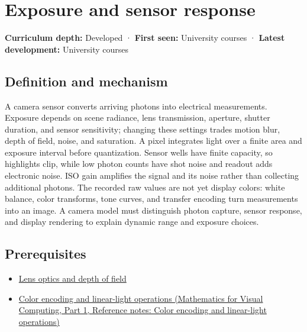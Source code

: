 \hypertarget{appendix-92d45cdf2afc}{}\label{referencestart:appendix-92d45cdf2afc}
\section{Exposure and sensor response}\label{appendix-92d45cdf2afc-exposure-and-sensor-response}

\hypertarget{appendix-92d45cdf2afc-exposure-and-sensor-response}{}

\textbf{Curriculum depth:} Developed · \textbf{First seen:} University courses · \textbf{Latest development:} University courses

\begin{allmightroledefinition}

\subsection{Definition and mechanism}\label{appendix-92d45cdf2afc-definition-and-mechanism}

\hypertarget{appendix-92d45cdf2afc-definition-and-mechanism}{}

A camera sensor converts arriving photons into electrical measurements. Exposure depends on scene radiance, lens transmission, aperture, shutter duration, and sensor sensitivity; changing these settings trades motion blur, depth of field, noise, and saturation. A pixel integrates light over a finite area and exposure interval before quantization. Sensor wells have finite capacity, so highlights clip, while low photon counts have shot noise and readout adds electronic noise. ISO gain amplifies the signal and its noise rather than collecting additional photons. The recorded raw values are not yet display colors: white balance, color transforms, tone curves, and transfer encoding turn measurements into an image. A camera model must distinguish photon capture, sensor response, and display rendering to explain dynamic range and exposure choices.

\end{allmightroledefinition}

\subsection{Prerequisites}\label{appendix-92d45cdf2afc-prerequisites}

\hypertarget{appendix-92d45cdf2afc-prerequisites}{}

\begin{itemize}
\tightlist
\item
  \hyperref[appendix-21f8456e2629]{Lens optics and depth of field}
\item
  \href{../02-Mathematics-for-Visual-Computing-P01/main.pdf\#appendix-a9f83ad40792}{Color encoding and linear-light operations (Mathematics for Visual Computing, Part 1, Reference notes: Color encoding and linear-light operations)}
\end{itemize}

